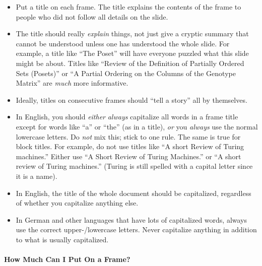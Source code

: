 \begin{itemize}
\item
  Put a title on each frame. The title explains the contents of the
  frame to people who did not follow all details on the slide.
\item
  The title should really \emph{explain} things, not just give a
  cryptic summary that cannot be understood unless one has understood
  the whole slide. For example, a title like ``The Poset'' will have
  everyone puzzled what this slide might be about. Titles like
  ``Review of the Definition of Partially Ordered Sets (Posets)'' or
  ``A Partial Ordering on the Columns of the Genotype Matrix'' are
  \emph{much} more informative.
\item
  Ideally, titles on consecutive frames should ``tell a story'' all by
  themselves.
\item
  In English, you should \emph{either} \emph{always} capitalize all words in
  a frame title except for words like ``a'' or ``the'' (as in a
  title), \emph{or} you \emph{always} use the normal lowercase
  letters. Do \emph{not} mix this; stick to one rule. The same is true
  for block titles. For example, do not use titles like ``A short
  Review of Turing machines.'' Either use ``A Short Review of Turing
  Machines.'' or ``A short review of Turing machines.'' (Turing is
  still spelled with a capital letter since it is a name).
\item
  In English, the title of the whole document should be
  capitalized, regardless of whether you capitalize anything else.
\item
  In German and other languages that have lots of capitalized words,
  always use the correct upper-/lowercase letters. Never capitalize
  anything in addition to what is usually capitalized.
\end{itemize}



\paragraph{How Much Can I Put On a Frame?}

